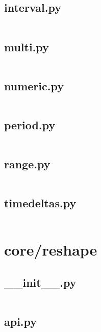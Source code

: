 \documentclass{article}
\begin{document}
\subsection{interval.py}
\inputminted{python}{/home/dufferzafar/dev/@clones/pandas/pandas/core/indexes/interval.py}
\newpage

\subsection{multi.py}
\inputminted{python}{/home/dufferzafar/dev/@clones/pandas/pandas/core/indexes/multi.py}
\newpage

\subsection{numeric.py}
\inputminted{python}{/home/dufferzafar/dev/@clones/pandas/pandas/core/indexes/numeric.py}
\newpage

\subsection{period.py}
\inputminted{python}{/home/dufferzafar/dev/@clones/pandas/pandas/core/indexes/period.py}
\newpage

\subsection{range.py}
\inputminted{python}{/home/dufferzafar/dev/@clones/pandas/pandas/core/indexes/range.py}
\newpage

\subsection{timedeltas.py}
\inputminted{python}{/home/dufferzafar/dev/@clones/pandas/pandas/core/indexes/timedeltas.py}
\newpage

\section{core/reshape}

\subsection{\_\_init\_\_.py}
\inputminted{python}{/home/dufferzafar/dev/@clones/pandas/pandas/core/reshape/__init__.py}
\newpage

\subsection{api.py}
\inputminted{python}{/home/dufferzafar/dev/@clones/pandas/pandas/core/reshape/api.py}
\newpage
\end{document}
